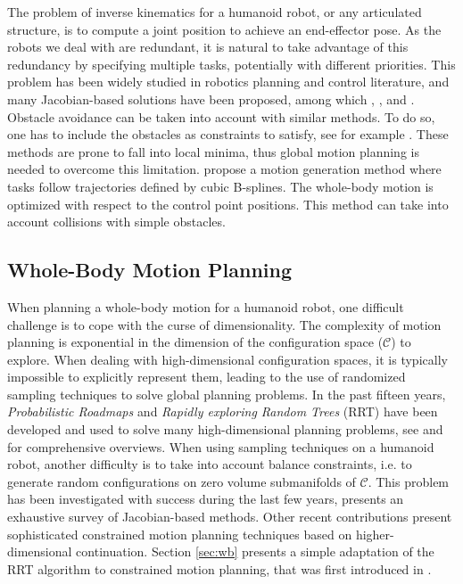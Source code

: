 \documentclass{article}
\begin{document}
The problem of inverse kinematics for a humanoid robot, or any articulated
structure, is to compute a joint position to achieve an end-effector pose. As the
robots we deal with are redundant, it is natural to take advantage of
this redundancy by specifying multiple tasks, potentially with
different priorities. This problem has been widely studied in robotics
planning and control literature, and many Jacobian-based solutions have been
proposed, among which 
\cite{nakamura1986iks}, \cite{siciliano1991gfm},
\cite{baerlocher1998tpf} and \cite{khatib2004wbd}.
Obstacle avoidance can be taken into account with similar methods. To
do so, one has to include the obstacles as  constraints to
satisfy, see for example \cite{kanehiro2008lca}.
These methods are prone to fall into local minima, thus global motion
planning is needed to overcome this limitation.
\cite{TouGieGoe2007} propose a motion generation method where tasks follow
trajectories defined by cubic B-splines. The whole-body motion is optimized
with respect to the control point positions. This method can take into account
collisions with simple obstacles.

\subsection{Whole-Body Motion Planning}

When  planning a  whole-body motion  for a  humanoid robot, one difficult
challenge is to cope with  the curse of dimensionality. The complexity
of   motion  planning  is   exponential  in   the  dimension   of  the
configuration  space ($\mathcal{C}$)  to explore.  When  dealing with
high-dimensional configuration  spaces, it is  typically impossible to
explicitly represent  them, leading to the use  of randomized sampling
techniques  to solve  global planning  problems. In  the  past fifteen
years,  \textit{Probabilistic Roadmaps} \cite{kavraki1996prp} and  
\textit{Rapidly exploring Random  Trees} (RRT) 
\cite{kuffner00rrtconnect}  have been  developed and  used to  solve many
high-dimensional   planning  problems, see \cite{Lav06} and \cite{choset2005prm} for comprehensive
overviews.
When  using  sampling  techniques  on  a humanoid  robot,  another difficulty
is to  take into  account balance  constraints,  i.e. to
generate  random  configurations   on  zero  volume  submanifolds  of
$\mathcal{C}$. This problem has been investigated with success during
the last few years, \cite{Berenson15032011} presents an exhaustive survey
of Jacobian-based methods. Other recent contributions \cite{porta2012randomized}
present sophisticated constrained motion planning techniques based on higher-dimensional
continuation. Section \ref{sec:wb} presents a simple adaptation
of the RRT algorithm to constrained motion planning, that was first
introduced in \cite{dalibard09}.
\end{document}
